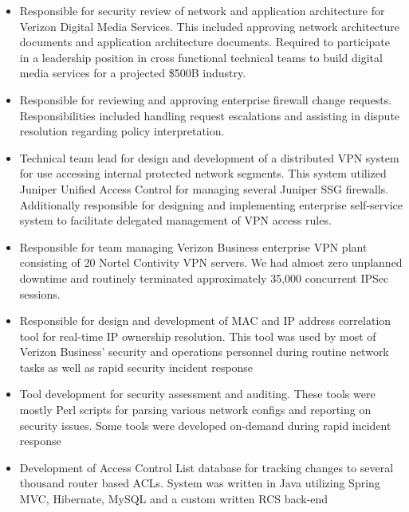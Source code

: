 \begin{itemize}
\item
Responsible for security review of network and application architecture for
Verizon Digital Media Services.  This included approving network architecture
documents and application architecture documents.  Required to participate in a
leadership position in cross functional technical teams to build digital media
services for a projected \$500B industry.

\item
Responsible for reviewing and approving enterprise firewall change requests.
Responsibilities included handling request escalations and assisting in dispute
resolution regarding policy interpretation.

\item
Technical team lead for design and development of a distributed VPN system for
use accessing internal protected network segments.  This system utilized Juniper
Unified Access Control for managing several Juniper SSG firewalls.  Additionally
responsible for designing and implementing enterprise self-service system to
facilitate delegated management of VPN access rules.

\item
Responsible for team managing Verizon Business enterprise VPN plant consisting of
20 Nortel Contivity VPN servers.  We had almost zero unplanned downtime and routinely
terminated approximately 35,000 concurrent IPSec sessions.

\item
Responsible for design and development of MAC and IP address correlation tool
for real-time IP ownership resolution.  This tool was used by most of Verizon
Business’ security and operations personnel during routine network tasks as well
as rapid security incident response

\item
Tool development for security assessment and auditing. These tools were mostly
Perl scripts for parsing various network configs and reporting on security
issues.  Some tools were developed on-demand during rapid incident response

\item 
Development of Access Control List database for tracking changes to several
thousand router based ACLs. System was written in Java utilizing Spring MVC,
Hibernate, MySQL and a custom written RCS back-end
\end{itemize}

